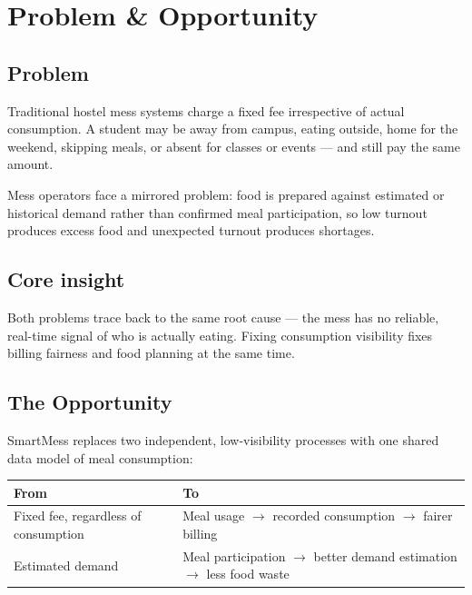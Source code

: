 \documentclass[12pt,a4paper]{article}
\begin{document}
\section{Problem \& Opportunity}

\subsection*{Problem}

Traditional hostel mess systems charge a fixed fee irrespective of actual
consumption. A student may be away from campus, eating outside, home for the
weekend, skipping meals, or absent for classes or events --- and still pay the
same amount.

Mess operators face a mirrored problem: food is prepared against estimated or
historical demand rather than confirmed meal participation, so low turnout
produces excess food and unexpected turnout produces shortages.

\subsection*{Core insight}

Both problems trace back to the same root cause --- the mess has no reliable,
real-time signal of who is actually eating. Fixing consumption visibility fixes
billing fairness and food planning at the same time.

\subsection*{The Opportunity}

SmartMess replaces two independent, low-visibility processes with one shared
data model of meal consumption:

\begin{center}
\begin{tabularx}{0.92\textwidth}{L{0.42\textwidth} Y}
\toprule
\textbf{From} & \textbf{To}\\
\midrule
Fixed fee, regardless of consumption &
Meal usage $\rightarrow$ recorded consumption $\rightarrow$ fairer billing\\
Estimated demand &
Meal participation $\rightarrow$ better demand estimation $\rightarrow$ less food waste\\
\bottomrule
\end{tabularx}
\end{center}

\end{document}
